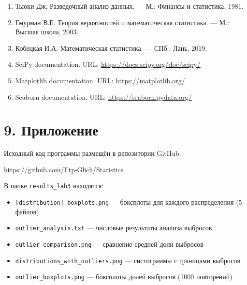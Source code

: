 \documentclass[a4paper,14pt]{extarticle}
\begin{document}
\begin{enumerate}
    \item Тьюки Дж. Разведочный анализ данных. — М.: Финансы и статистика, 1981.
    
    \item Гмурман В.Е. Теория вероятностей и математическая статистика. — М.: Высшая школа, 2003.
    
    \item Кобецкая И.А. Математическая статистика. — СПб.: Лань, 2019.
    
    \item SciPy documentation. URL: \url{https://docs.scipy.org/doc/scipy/}
    
    \item Matplotlib documentation. URL: \url{https://matplotlib.org/}
    
    \item Seaborn documentation. URL: \url{https://seaborn.pydata.org/}
\end{enumerate}

\section*{9. Приложение}

Исходный код программы размещён в репозитории GitHub:

\url{https://github.com/Ftp-Glich/Statistics}

В папке \texttt{results\_lab3} находятся:
\begin{itemize}
    \item \texttt{[distribution]\_boxplots.png} — боксплоты для каждого распределения (5 файлов)
    \item \texttt{outlier\_analysis.txt} — числовые результаты анализа выбросов
    \item \texttt{outlier\_comparison.png} — сравнение средней доли выбросов
    \item \texttt{distributions\_with\_outliers.png} — гистограммы с границами выбросов
    \item \texttt{outlier\_boxplots.png} — боксплоты долей выбросов (1000 повторений)
\end{itemize}
\end{document}
